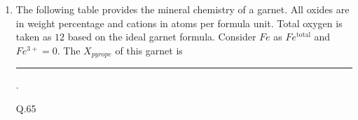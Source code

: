 \documentclass[journal,12pt,onecolumn]{IEEEtran}
\theoremstyle{remark}
\begin{document}
\begin{enumerate}
\item The following table provides the mineral chemistry of a garnet. All oxides are in weight percentage and cations in atoms per formula unit. Total oxygen is taken as $12$ based on the ideal garnet formula. Consider $Fe$ as $Fe^{\text{total}}$ and $Fe^{3+}=0$. The $X_{pyrope}$ of this garnet is \rule{3cm}{0.15mm}. 
\begin{table}[H]
    \centering
    
    \caption{Q.65}    
    \label{tab:placeholder}
\end{table}
\hfill{}

\end{enumerate}
\end{document}
